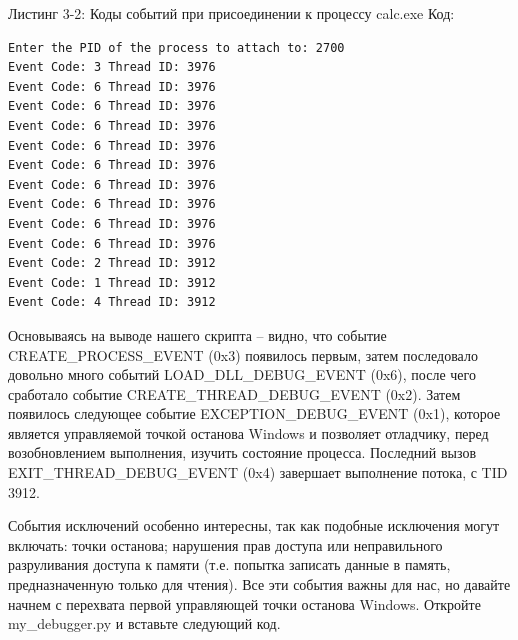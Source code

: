 \documentclass[12pt, a4paper, oneside]{book}
\begin{document}
Листинг 3-2: Коды событий при присоединении к процессу calc.exe
Код:
\begin{verbatim}
Enter the PID of the process to attach to: 2700
Event Code: 3 Thread ID: 3976
Event Code: 6 Thread ID: 3976
Event Code: 6 Thread ID: 3976
Event Code: 6 Thread ID: 3976
Event Code: 6 Thread ID: 3976
Event Code: 6 Thread ID: 3976
Event Code: 6 Thread ID: 3976
Event Code: 6 Thread ID: 3976
Event Code: 6 Thread ID: 3976
Event Code: 6 Thread ID: 3976
Event Code: 2 Thread ID: 3912
Event Code: 1 Thread ID: 3912
Event Code: 4 Thread ID: 3912
\end{verbatim}

Основываясь на выводе нашего скрипта – видно, что событие CREATE\_PROCESS\_EVENT (0x3) появилось первым, затем последовало довольно много событий LOAD\_DLL\_DEBUG\_EVENT (0x6), после чего сработало событие CREATE\_THREAD\_DEBUG\_EVENT (0x2). Затем появилось следующее событие EXCEPTION\_DEBUG\_EVENT (0x1), которое является управляемой точкой останова Windows и позволяет отладчику, перед возобновлением выполнения, изучить состояние процесса. Последний вызов EXIT\_THREAD\_DEBUG\_EVENT (0x4) завершает выполнение потока, с TID 3912.

События исключений особенно интересны, так как подобные исключения могут включать: точки останова; нарушения прав доступа или неправильного разруливания доступа к памяти (т.е. попытка записать данные в память, предназначенную только для чтения). Все эти события важны для нас, но давайте начнем с перехвата первой управляющей точки останова Windows. Откройте my\_debugger.py и вставьте следующий код.
\end{document}
